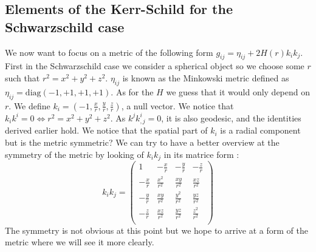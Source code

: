 \documentclass[a4paper,12pt]{article}
\theoremstyle{definition}
\begin{document}
\subsection{Elements of the Kerr-Schild for the Schwarzschild case}
We now want to focus on a metric of the following form $g_{ij}=\eta_{ij}+2H(r)k_ik_j$.
First in the Schwarzschild case we consider a spherical object so we choose some $r$ such that $r^2=x^2+y^2+z^2$.
$\eta_{ij}$ is known as the Minkowski metric defined as $\eta_{ij}=\text{diag}(-1,+1,+1,+1)$.
As for the $H$ we guess that it would only depend on $r$.
We define $k_i=(-1,\frac{x}{r},\frac{y}{r},\frac{z}{r})$, a null vector.
We notice that $k_ik^i=0 \Leftrightarrow r^2=x^2+y^2+z^2$.
As $k^jk^i_{,j}=0$, it is also geodesic, and the identities derived earlier hold.
We notice that the spatial part of $k_i$ is a radial component but is the metric symmetric?
We can try to have a better overview at the symmetry of the metric by looking of $k_ik_j$ in its matrice form :
\begin{equation}
	k_ik_j=\left(
	\begin{array}{cccc}
	1 & -\frac{x}{r} & -\frac{y}{r} & -\frac{z}{r} \\
	-\frac{x}{r} & \frac{x^2}{r^2} & \frac{x y}{r^2} &
	\frac{x z}{r^2} \\
	-\frac{y}{r} & \frac{x y}{r^2} & \frac{y^2}{r^2} &
	\frac{y z}{r^2} \\
	-\frac{z}{r} & \frac{x z}{r^2} & \frac{y z}{r^2} &
	\frac{z^2}{r^2} \\
	\end{array}
	\right)
\end{equation}
The symmetry is not obvious at this point but we hope to arrive at a form of the metric where we will see it more clearly.
\end{document}
